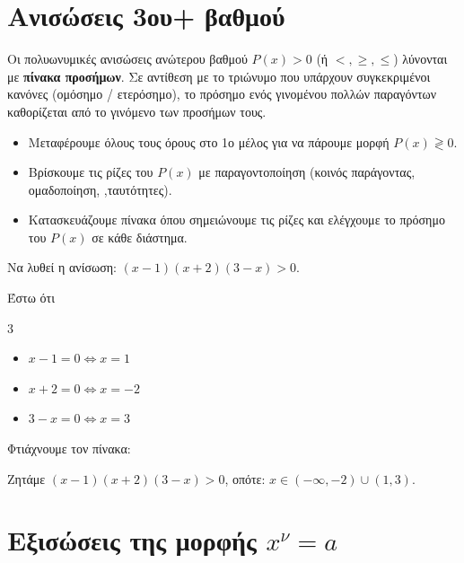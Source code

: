 \section{Ανισώσεις 3ου+ βαθμού}

Οι πολυωνυμικές ανισώσεις ανώτερου βαθμού $P(x) > 0$ (ή $<, \ge, \le$) λύνονται με \textbf{πίνακα προσήμων}.
Σε αντίθεση με το τριώνυμο που υπάρχουν συγκεκριμένοι κανόνες (ομόσημο / ετερόσημο), το πρόσημο ενός γινομένου πολλών παραγόντων καθορίζεται από το γινόμενο των προσήμων τους.


\begin{itemize}
    \item Μεταφέρουμε όλους τους όρους στο 1ο μέλος για να πάρουμε μορφή $P(x) \gtrless 0$.
    \item Βρίσκουμε τις ρίζες του $P(x)$ με παραγοντοποίηση (κοινός παράγοντας, ομαδοποίηση, ,ταυτότητες).
    \item Κατασκευάζουμε πίνακα όπου σημειώνουμε τις ρίζες και ελέγχουμε το πρόσημο του $P(x)$ σε κάθε διάστημα.
\end{itemize}


Να λυθεί η ανίσωση: $(x - 1)(x + 2)(3 - x) > 0$.

\lysh
Έστω ότι
\begin{multicols}{3}
\begin{itemize}
\item $x-1=0\Leftrightarrow x=1$
\item $x+2=0\Leftrightarrow x=-2$
\item $3-x=0\Leftrightarrow x=3$
\end{itemize}
\end{multicols}
Φτιάχνουμε τον πίνακα:
\begin{center}
\end{center}
Ζητάμε $(x - 1)(x + 2)(3 - x)> 0$, οπότε: $x \in (-\infty, -2) \cup (1, 3)$.

\section{Εξισώσεις της μορφής $x^\nu=a$ }

